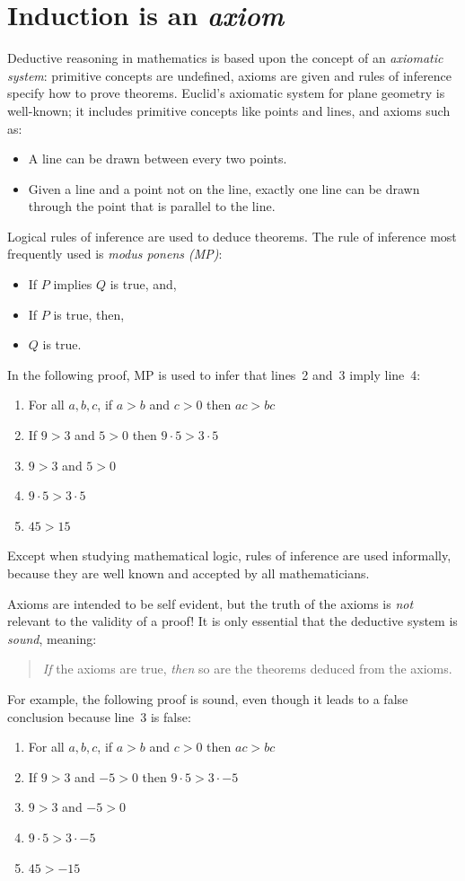 \documentclass[11pt,a4paper]{report}
\begin{document}
\section{Induction is an \emph{axiom}}

Deductive reasoning in mathematics is based upon the concept of an \emph{axiomatic system}: primitive concepts are undefined, axioms are given and rules of inference specify how to prove theorems. Euclid's axiomatic system for plane geometry is well-known; it includes primitive concepts like points and lines, and axioms such as:
\begin{itemize}
\item A line can be drawn between every two points.
\item Given a line and a point not on the line, exactly one line can be drawn through the point that is parallel to the line.
\end{itemize}
Logical rules of inference are used to deduce theorems. The rule of inference most frequently used is \emph{modus ponens (MP)}:
\pagebreak[3]
\begin{itemize}
\item If $P$ implies $Q$ is true, and,
\item If $P$ is true, then,
\item $Q$ is true.
\end{itemize}
In the following proof, MP is used to infer that lines~2 and~3 imply line~4:
\begin{enumerate}
\item For all $a,b,c$, if $a>b$ and $c>0$ then $ac>bc$
\item If $9>3$ and $5>0$ then $9\cdot 5> 3\cdot 5$
\item $9>3$ and $5>0$
\item $9\cdot 5> 3\cdot 5$
\item $45>15$
\end{enumerate}
Except when studying mathematical logic, rules of inference are used informally, because they are well known and accepted by all mathematicians.

Axioms are intended to be self evident, but the truth of the axioms is \emph{not} relevant to the validity of a proof! It is only essential that the deductive system is \emph{sound}, meaning:
\begin{quote}
\emph{If} the axioms are true, \emph{then} so are the theorems deduced from the axioms.
\end{quote}
For example, the following proof is sound, even though it leads to a false conclusion because line~3 is false:
\begin{enumerate}
\item For all $a,b,c$, if $a>b$ and $c>0$ then $ac>bc$
\item If $9>3$ and $-5>0$ then $9\cdot 5> 3\cdot -5$
\item $9>3$ and $-5>0$
\item $9\cdot 5> 3\cdot -5$
\item $45>-15$
\end{enumerate}
\end{document}
